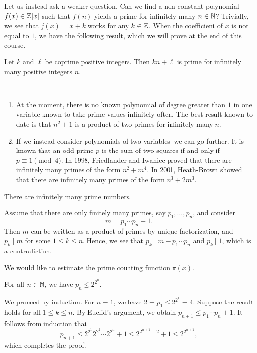 Let us instead ask a weaker question. Can we find a non-constant polynomial $f(x) \in \mathbb{Z}[x]$ such that 
$f(n)$ yields a prime for infinitely many $n \in \mathbb{N}$? Trivially, we see that $f(x) = x+k$ works 
for any $k \in \mathbb{Z}$. When the coefficient of $x$ is not equal to $1$, we have the following result, 
which we will prove at the end of this course.

\begin{thm}[Dirichlet]\label{thm:1.4}
Let $k$ and $\ell$ be coprime positive integers. Then $kn+\ell$ is prime for infinitely many positive
integers $n$. 
\end{thm}

\begin{remark}\label{remark:1.5}~
\begin{enumerate}[(1)]
    \item At the moment, there is no known polynomial of degree greater than $1$ in one variable 
    known to take prime values infinitely often. The best result known to date is that $n^2+1$ is 
    a product of two primes for infinitely many $n$.
    \item If we instead consider polynomials of two variables, we can go further. It is known that 
    an odd prime $p$ is the sum of two squares if and only if $p \equiv 1 \pmod 4$. 
    In 1998, Friedlander and Iwaniec proved that there are infinitely many primes of the 
    form $n^2 + m^4$. In 2001, Heath-Brown showed that there are infinitely many primes of 
    the form $n^3 + 2m^3$. 
\end{enumerate}
\end{remark}

\begin{thm}[Euclid]\label{thm:1.6}
There are infinitely many prime numbers.
\end{thm}
\begin{pf}
Assume that there are only finitely many primes, say $p_1, \dots, p_n$, and consider 
\[ m = p_1 \cdots p_n + 1. \]
Then $m$ can be written as a product of primes by unique factorization, and $p_k \mid m$ for some $1 \leq
k \leq n$. 
Hence, we see that $p_k \mid m - p_1 \cdots p_n$ and $p_k \mid 1$, which is a contradiction. 
\end{pf}

We would like to estimate the prime counting function $\pi(x)$. 

\begin{prop}\label{prop:1.7}
For all $n \in \mathbb{N}$, we have $p_n \leq 2^{2^n}$. 
\end{prop}
\begin{pf}
We proceed by induction. For $n = 1$, we have $2 = p_1 \leq 2^{2^1} = 4$. Suppose the result 
holds for all $1 \leq k \leq n$. By Euclid's argument, we obtain $p_{n+1} \leq p_1 \cdots p_n + 1$. 
It follows from induction that 
\[ p_{n+1} \leq 2^{2^1} 2^{2^2} \cdots 2^{2^n} + 1 \leq 2^{2^{n+1}-2} + 1 \leq 2^{2^{n+1}}, \]
which completes the proof. 
\end{pf}

